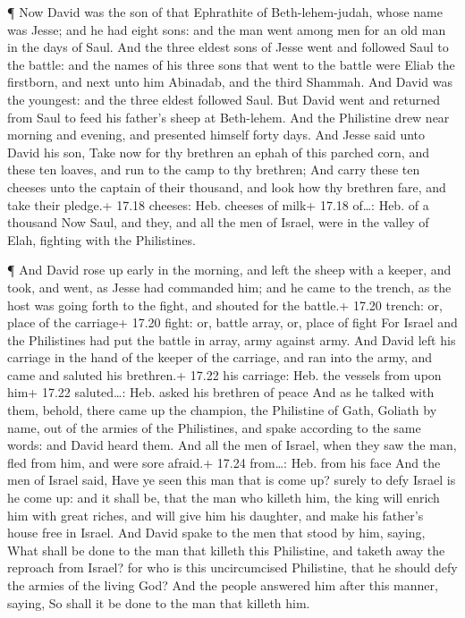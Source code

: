  ¶ Now David was the son of that Ephrathite of
Beth-lehem-judah, whose name was Jesse; and he had eight sons: and the
man went among men for an old man in the days of Saul.  And
the three eldest sons of Jesse went and followed Saul to the battle: and
the names of his three sons that went to the battle were Eliab the
firstborn, and next unto him Abinadab, and the third Shammah.
 And David was the youngest: and the three eldest followed
Saul.  But David went and returned from Saul to feed his
father's sheep at Beth-lehem.  And the Philistine drew near
morning and evening, and presented himself forty days.  And
Jesse said unto David his son, Take now for thy brethren an ephah of
this parched corn, and these ten loaves, and run to the camp to thy
brethren;  And carry these ten cheeses unto the captain of
their thousand, and look how thy brethren fare, and take their pledge.+
17.18 cheeses: Heb. cheeses of milk+ 17.18 of\ldots: Heb. of a thousand
 Now Saul, and they, and all the men of Israel, were in the
valley of Elah, fighting with the Philistines.

 ¶ And David rose up early in the morning, and left the
sheep with a keeper, and took, and went, as Jesse had commanded him; and
he came to the trench, as the host was going forth to the fight, and
shouted for the battle.+ 17.20 trench: or, place of the carriage+ 17.20
fight: or, battle array, or, place of fight  For Israel and
the Philistines had put the battle in array, army against army.
 And David left his carriage in the hand of the keeper of
the carriage, and ran into the army, and came and saluted his brethren.+
17.22 his carriage: Heb. the vessels from upon him+ 17.22 saluted\ldots:
Heb. asked his brethren of peace  And as he talked with
them, behold, there came up the champion, the Philistine of Gath,
Goliath by name, out of the armies of the Philistines, and spake
according to the same words: and David heard them.  And all
the men of Israel, when they saw the man, fled from him, and were sore
afraid.+ 17.24 from\ldots: Heb. from his face  And the men
of Israel said, Have ye seen this man that is come up? surely to defy
Israel is he come up: and it shall be, that the man who killeth him, the
king will enrich him with great riches, and will give him his daughter,
and make his father's house free in Israel.  And David
spake to the men that stood by him, saying, What shall be done to the
man that killeth this Philistine, and taketh away the reproach from
Israel? for who is this uncircumcised Philistine, that he should defy
the armies of the living God?  And the people answered him
after this manner, saying, So shall it be done to the man that killeth
him.

